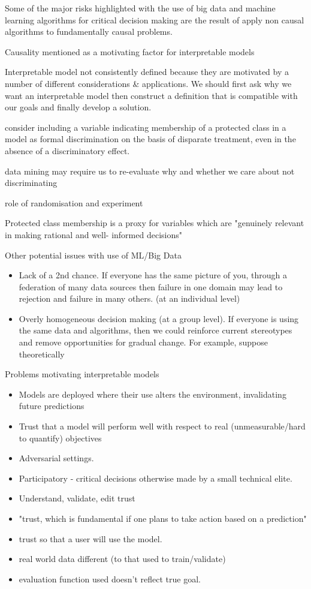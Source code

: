 \documentclass{article}
\theoremstyle{plain}
\theoremstyle{definition}
\begin{document}
Some of the major risks highlighted with the use of big data and machine learning algorithms for critical decision making are the result of apply non causal algorithms to fundamentally causal problems. 

Causality mentioned as a motivating factor for interpretable models \cite{Lipton2016}


Interpretable model not consistently defined because they are motivated by a number of different considerations \& applications. We should first ask why we want an interpretable model then construct a definition that is compatible with our goals and finally develop a solution. 


\cite{Barocas2014} consider including a variable indicating membership of a protected class in a model as formal discrimination on the basis of disparate treatment, even in the absence of a discriminatory effect.

data mining may require us to re-evaluate why and whether we care about not discriminating \cite{Barocas2014}

role of randomisation and experiment

Protected class membership is a proxy for variables which are "genuinely relevant in making rational and well- informed decisions" \cite{Barocas2014}

Other potential issues with use of ML/Big Data
\begin{itemize}
\item Lack of a 2nd chance. If everyone has the same picture of you, through a federation of many data sources then failure in one domain may lead to rejection and failure in many others. (at an individual level)
\item Overly homogeneous decision making (at a group level). If everyone is using the same data and algorithms, then we could reinforce current stereotypes and remove opportunities for gradual change. For example, suppose theoretically 
\end{itemize}

Problems motivating interpretable models
\begin{itemize}
\item Models are deployed where their use alters the environment, invalidating future predictions
\item Trust that a model will perform well with respect to real (unmeasurable/hard to quantify) objectives
\item Adversarial settings. 
\item Participatory - critical decisions otherwise made by a small technical elite. 
\item Understand, validate, edit trust \cite{Caruana2015}
\item "trust, which is fundamental if one plans to take action based on a prediction" \cite{Ribeiro2016}
\item trust so that a user will use the model.
\item real world data different (to that used to train/validate)
\item evaluation function used doesn't reflect true goal.
\end{itemize}
\end{document}
